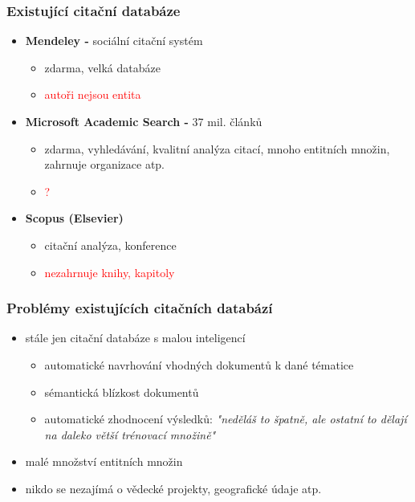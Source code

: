 \documentclass{beamer}
\begin{document}
\begin{frame}
  \frametitle{Existující citační databáze}
  \begin{itemize}
    \item {\textbf{Mendeley -} sociální citační systém}
      \begin{itemize}
        \item \textcolor{green!50!black}{zdarma, velká databáze} 
        \item \textcolor{red}{autoři nejsou entita}
      \end{itemize}
    \item {\textbf{Microsoft Academic Search -} 37 mil. článků}
      \begin{itemize}
        \item \textcolor{green!50!black}{zdarma, vyhledávání, kvalitní analýza citací,
                                         mnoho entitních množin, zahrnuje organizace atp.} 
        \item \textcolor{red}{?}
      \end{itemize}
    \item {\textbf{Scopus (Elsevier)}}
      \begin{itemize}
        \item \textcolor{green!50!black}{citační analýza, konference}
        \item \textcolor{red}{nezahrnuje knihy, kapitoly}
      \end{itemize}
  \end{itemize}
\end{frame}

\begin{frame}
  \frametitle{Problémy existujících citačních databází}
  \begin{itemize}
    \item stále jen citační databáze s malou inteligencí
      \begin{itemize}
        \item automatické navrhování vhodných dokumentů k dané tématice
        \item sémantická blízkost dokumentů
        \item automatické zhodnocení výsledků: \textit{"neděláš to špatně, ale ostatní to dělají na daleko větší trénovací množině"}
      \end{itemize}
    \item malé množství entitních množin
    \item nikdo se nezajímá o vědecké projekty, geografické údaje atp.
  \end{itemize}
\end{frame}
\end{document}
